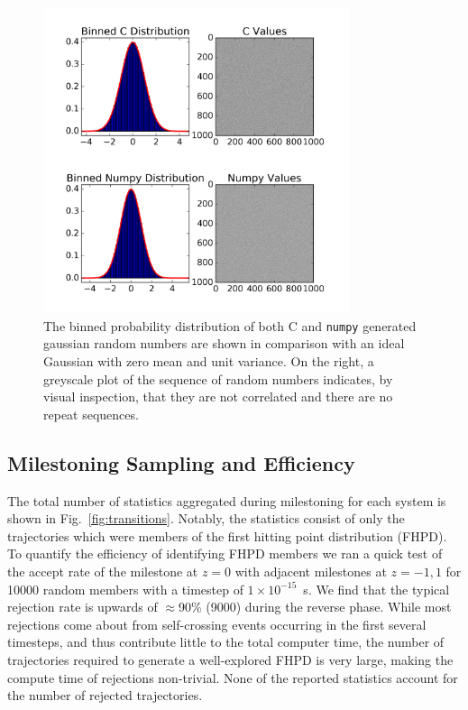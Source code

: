         \begin{figure}[!htbp]
        \begin{center}
            \includegraphics[width=0.8\textwidth]{Figures/testRNG}
            \caption[Randomness of gaussian random numbers]{The binned probability distribution of both C and \texttt{numpy} generated gaussian random numbers are shown in comparison with an ideal Gaussian with zero mean and unit variance. On the right, a greyscale plot of the sequence of random numbers indicates, by visual inspection, that they are not correlated and there are no repeat sequences.}
            \label{fig:testRNG}
        \end{center}
        \end{figure}

    \subsection{Milestoning Sampling and Efficiency}
        \par The total number of statistics aggregated during milestoning for each system is shown in Fig.~\ref{fig:transitions}. Notably, the statistics consist of only the trajectories which were members of the first hitting point distribution (FHPD). To quantify the efficiency of identifying FHPD members we ran a quick test of the accept rate of the milestone at $z=0$ with adjacent milestones at $z=-1,1$ for 10000 random members with a timestep of $1\times 10^{-15}$~s. We find that the typical rejection rate is upwards of $\approx$90\% (9000) during the reverse phase. While most rejections come about from self-crossing events occurring in the first several timesteps, and thus contribute little to the total computer time, the number of trajectories required to generate a well-explored FHPD is very large, making the compute time of rejections non-trivial. None of the reported statistics account for the number of rejected trajectories.

